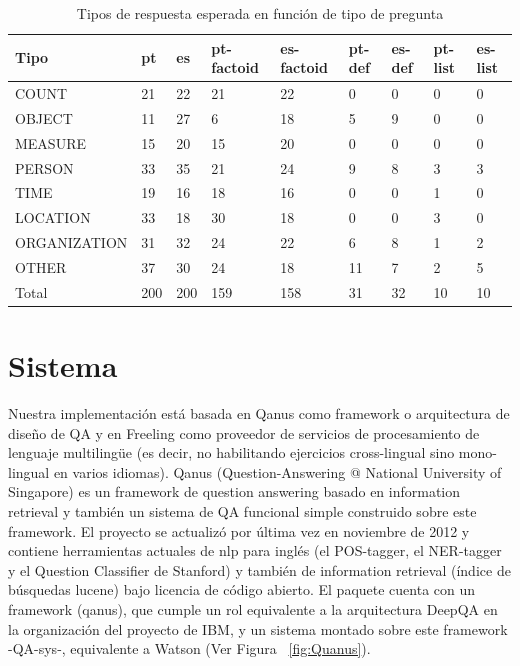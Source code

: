 \begin{center}
\begin{table}
\centering
\begin{tabular}{| l | l | l | l | l | l |l |l|l|}
\hline
Tipo & pt & es & pt-factoid & es-factoid & pt-def & es-def & pt-list & es-list \\ \hline
COUNT & 21 & 22 & 21 & 22 & 0 & 0 & 0  & 0\\ \hline
OBJECT & 11 & 27 & 6  & 18 & 5 & 9 & 0  & 0\\ \hline
MEASURE & 15 & 20 & 15 & 20 & 0 & 0 & 0  & 0\\ \hline
PERSON & 33  & 35 & 21 & 24 & 9 & 8 & 3 & 3\\ \hline
TIME & 19 & 16 & 18 & 16 & 0 & 0 & 1 & 0\\ \hline
LOCATION & 33 & 18  & 30 & 18 & 0 & 0 & 3 & 0 \\ \hline
ORGANIZATION & 31 & 32 & 24 & 22 & 6 & 8 & 1 & 2\\ \hline
OTHER & 37 & 30 & 24 & 18 & 11 & 7 & 2 & 5 \\ \hline
Total & 200 & 200 & 159 & 158 & 31 & 32  & 10 & 10\\ \hline
\end{tabular}
\caption{Tipos de respuesta esperada en función de tipo de pregunta}
\label{table:tipo-general}
\end{table}
\end{center}


\section{Sistema}
\label{sec:sistema}

Nuestra implementación está basada en Qanus como framework o arquitectura de diseño de QA y en Freeling como proveedor de servicios de procesamiento de lenguaje multilingüe (es decir, no habilitando ejercicios cross-lingual sino mono-lingual en varios idiomas). Qanus (Question-Answering @ National University of Singapore) es un framework de question answering basado en information retrieval y también un sistema de QA funcional simple construido sobre este framework. El proyecto se actualizó por última vez en noviembre de 2012 y contiene herramientas actuales de nlp para inglés (el POS-tagger, el NER-tagger y el Question Classifier de Stanford) y también de information retrieval (índice de búsquedas lucene) bajo licencia de código abierto. El paquete cuenta con un framework (qanus), que cumple un rol equivalente a la arquitectura DeepQA en la organización del proyecto de IBM, y un sistema montado sobre este framework -QA-sys-, equivalente a Watson (Ver Figura ~\ref{fig:Quanus}).


